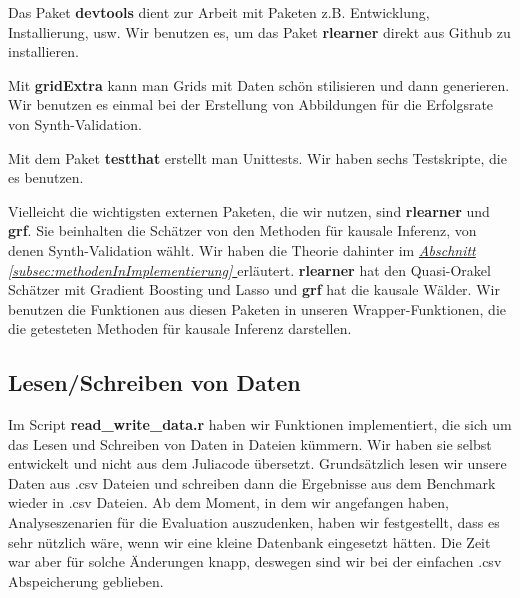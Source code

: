 \documentclass[12pt,a4paper,twoside]{scrartcl}
\numberwithin{equation}{section}
\newcommand{\refsec}[1]{\emph{\hyperref[#1]{Abschnitt \ref*{#1} }}}
\begin{document}
\noindent
Das Paket \textbf{devtools} dient zur Arbeit mit Paketen z.B. Entwicklung, Installierung, usw. Wir benutzen es, um das Paket \textbf{rlearner} direkt aus Github zu installieren.\par

\noindent
Mit \textbf{gridExtra} kann man Grids mit Daten schön stilisieren und dann generieren. Wir benutzen es einmal bei der Erstellung von Abbildungen für die Erfolgsrate von Synth-Validation.\par

\noindent
Mit dem Paket \textbf{testthat} erstellt man Unittests. Wir haben sechs Testskripte, die es benutzen.\par

\noindent
Vielleicht die wichtigsten externen Paketen, die wir nutzen, sind \textbf{rlearner} und \textbf{grf}. Sie beinhalten die Schätzer von den Methoden für kausale Inferenz, von denen Synth-Validation wählt. Wir haben die Theorie dahinter im \refsec{subsec:methodenInImplementierung} erläutert. \textbf{rlearner} hat den Quasi-Orakel Schätzer mit Gradient Boosting und Lasso und  \textbf{grf} hat die kausale Wälder. Wir benutzen die Funktionen aus diesen Paketen in unseren Wrapper-Funktionen, die die getesteten Methoden für kausale Inferenz darstellen.\par
\subsection{Lesen/Schreiben von Daten}\label{subsec:lesenSchreibenDaten}

\noindent
Im Script \textbf{read\_write\_data.r} haben wir Funktionen implementiert, die sich um das Lesen und Schreiben von Daten in Dateien kümmern. Wir haben sie selbst entwickelt und nicht aus dem Juliacode übersetzt. Grundsätzlich lesen wir unsere Daten aus .csv Dateien und schreiben dann die Ergebnisse aus dem Benchmark wieder in .csv Dateien. Ab dem Moment, in dem wir angefangen haben, Analyseszenarien für die Evaluation auszudenken, haben wir festgestellt, dass es sehr nützlich wäre, wenn wir eine kleine Datenbank eingesetzt hätten. Die Zeit war aber für solche Änderungen knapp, deswegen sind wir bei der einfachen .csv Abspeicherung geblieben.\par 
\end{document}
